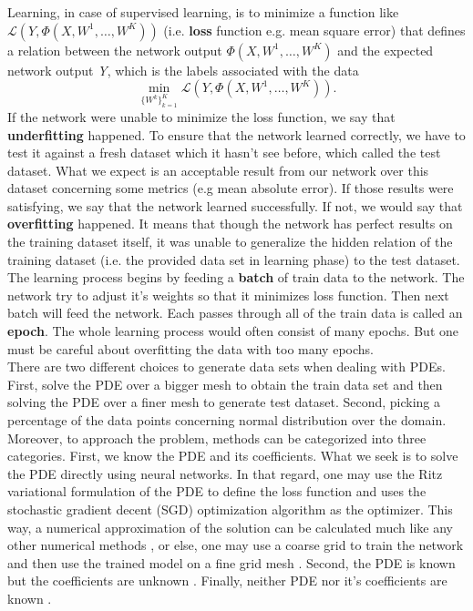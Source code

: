 Learning, in case of supervised learning, is to minimize a function like $ \mathscr{L}(Y, \Phi(X, W^1,\dots, W^K))$ (i.e. \textbf{loss} function e.g. mean square error) that defines a relation between the network output $\Phi(X, W^1,\dots, W^K)$ and the expected network output \textit{Y}, which is the labels associated with the data
\begin{equation}
\min_{\{W^k\}_{k=1}^{K}} \mathscr{L}(Y, \Phi(X,W^1,\dots,W^K)).
\end{equation}
If the network were unable to minimize the loss function, we say that \textbf{underfitting} happened. To ensure that the network learned correctly, we have to test it against a fresh dataset which it hasn't see before, which called the test dataset. What we expect is an acceptable result from our network over this dataset concerning some metrics (e.g mean absolute error). If those results were satisfying, we say that the network learned successfully. If not, we would say that \textbf{overfitting} happened. It means that though the network has perfect results on the training dataset itself, it was unable to generalize the hidden relation of the training dataset (i.e. the provided data set in learning phase) to the test dataset.\\
The learning process begins by feeding a \textbf{batch} of train data to the network. The network try to adjust it's weights so that it minimizes loss function. Then next batch will feed the network. Each passes through all of the train data is called an \textbf{epoch}. The whole learning process would often consist of many epochs. But one must be careful about overfitting the data with too many epochs.\\
There are two different choices to generate data sets when dealing with PDEs. First, solve the PDE over a bigger mesh to obtain the train data set and then solving the PDE over a finer mesh to generate test dataset. Second, picking a percentage of the data points concerning normal distribution over the domain. Moreover, to approach the problem, methods can be categorized into three categories. First, we know the PDE and its coefficients. What we seek is to solve the PDE directly using neural networks. In that regard, one may use the Ritz variational formulation of the PDE to define the loss function and uses the stochastic gradient decent (SGD) optimization algorithm as the optimizer. This way, a numerical approximation of the solution can be calculated much like any other numerical methods \cite{weinan2018deep}, or else, one may use a coarse grid to train the network and then use the trained model on a fine grid mesh \cite{wang2019prediction}. Second, the PDE is known but the coefficients are unknown \cite{raissi2017physics, Base_paper}. Finally, neither PDE nor it's coefficients are known \cite{raissi2018deep}. \\
